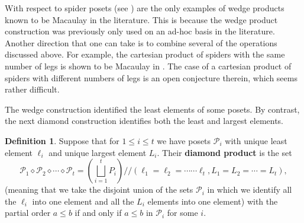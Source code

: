 \documentclass[11pt]{amsart}
\renewcommand{\P}{{\mathcal P}}
\newcommand{\di}{\diamond}
\theoremstyle{plain} %
\theoremstyle{definition}
\newtheorem{defn}[thm]{Definition}
\theoremstyle{remark}
\numberwithin{equation}{section}  %
\begin{document}
With respect to  spider posets (see ) are the only examples of wedge products known to be Macaulay in the literature. This is because the wedge product construction was previously only used on an ad-hoc basis in the literature. Another direction that one can take is to combine several of the operations discussed above. For example, the cartesian product of spiders with the same number of legs is  shown to be Macaulay in \cite{Bez2}. The case of a cartesian product of spiders with different numbers of legs is an open conjecture therein, which seems rather difficult.

The wedge construction identified the least elements of some posets. By contrast, the next diamond construction identifies both the least and largest elements.


\begin{tcolorbox}
\begin{defn}
Suppose that for $1\leq i\leq t$ we have posets $\P_i$ with unique least element $\ell_i$ and unique largest element $L_i$. Their {\bf diamond product} is the set
\[
\P_1\di \P_2 \di \cdots \di  \P_t=\left(\bigsqcup_{i=1}^t P_i \right)// (\ell_1=\ell_2=\cdots \cdots \ell_t, L_1=L_2=\cdots=L_t ),
\]
(meaning that we take the disjoint union of the sets $\P_i$ in which we identify all the $\ell_i$ into one element and all the $L_i$ elements into one element)
with the partial order $a\leq b$ if and only if $a\leq b$ in $\P_i$ for some $i$.
\end{defn}
\end{tcolorbox}
\end{document}
